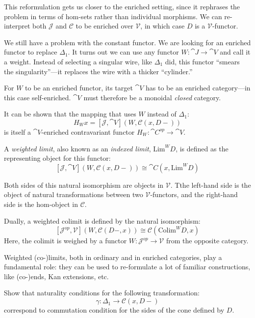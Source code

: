 \documentclass[DaoFP]{subfiles}
\begin{document}
This reformulation gets us closer to the enriched setting, since it rephrases the problem in terms of hom-sets rather than individual morphisms. We can re-interpret both $\mathcal J$ and $\mathcal C$ to be enriched over $\mathcal V$, in which case $D$ is a $\mathcal V$-functor. 

We still have a problem with the constant functor. We are looking for an enriched functor to replace $\Delta_1$. It turns out we can use any functor  $W \colon \cat J \to \cat V$ and call it a weight. Instead of selecting a singular wire, like $\Delta_1$ did, this functor ``smears the singularity''---it replaces the wire with a thicker ``cylinder.'' 

For $W$ to be an enriched functor, its target $\cat V$ has to be an enriched category---in this case self-enriched. $\cat V$ must therefore be a monoidal \emph{closed} category.

It can be shown that the mapping that uses $W$ instead of $\Delta_1$:
\[  H_W x = [\mathcal J, \cat V] (W, \mathcal C(x, D-)) \]
is itself a $\cat V$-enriched contravariant functor $H_W \colon \cat C^{op} \to \cat V$. 

A \emph{weighted limit}, also known as an \emph{indexed limit}, $\text{Lim}^W D$, is defined as the representing object for this functor:
\[  [\mathcal J, \cat V] (W, \mathcal C(x, D-)) \cong \cat C (x, \text{Lim}^W D ) \]

Both sides of this natural isomorphism are objects in $\mathcal V$. Tthe left-hand side is the object of natural transformations between two $\mathcal V$-functors, and the right-hand side is the hom-object in $\mathcal C$.

Dually, a weighted colimit is defined by the natural isomorphism:
\[   [\mathcal J^{op}, \mathcal V] (W, \mathcal C(D-, x))  \cong \mathcal C(\text{Colim}^W D, x) \]
Here, the colimit is weighed by a functor $W \colon \mathcal J^{op} \to \mathcal V$ from the opposite category.

Weighted (co-)limits, both in ordinary and in enriched categories, play a fundamental role: they can be used to re-formulate a lot of familiar constructions, like (co-)ends, Kan extensions, etc. 

\begin{exercise}
Show that naturality conditions for the following transformation:
\[ \gamma \colon \Delta_1 \to \mathcal C(x, D -) \]
correspond to commutation condition for the sides of the cone defined by $D$.
\end{exercise}
\end{document}
